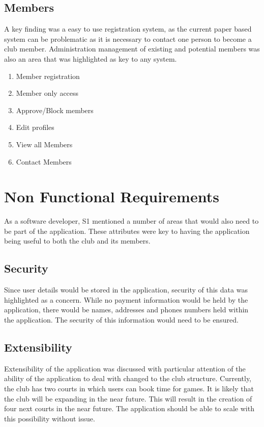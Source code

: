 \subsection{Members}

A key finding was a easy to use registration system, as the current paper based system can be problematic as it is necessary to contact one person to become a club member. Administration management of existing and potential members was also an area that was highlighted as key to any system.

\begin{enumerate}
\item Member registration
\item Member only access
\item Approve/Block members
\item Edit profiles
\item View all Members
\item Contact Members
\end{enumerate}

\section{Non Functional Requirements}

As a software developer, S1 mentioned a number of areas that would also need to be part of the application. These attributes were key to having the application being useful to both the club and its members.

\subsection{Security}

Since user details would be stored in the application, security of this data was highlighted as a concern. While no payment information would be held by the application, there would be names, addresses and phones numbers held within the application. The security of this information would need to be ensured.

\subsection{Extensibility}

Extensibility of the application was discussed with particular attention of the ability of the application to deal with changed to the club structure. Currently, the club has two courts in which users can book time for games. It is likely that the club will be expanding in the near future. This will result in the creation of four next courts in the near future. The application should be able to scale with this possibility without issue.

